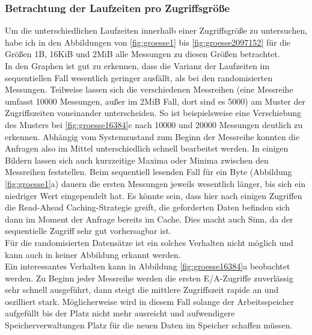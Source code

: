 \documentclass[
	12pt,
	a4paper,
	BCOR10mm,
	DIV14,
	listof=totoc,
	bibliography=totoc,
	headsepline
]{scrreprt}
\begin{document}
\subsubsection{Betrachtung der Laufzeiten pro Zugriffsgröße}
Um die unterschiedlichen Laufzeiten innerhalb einer Zugriffsgröße zu untersuchen, habe ich in den Abbildungen von \ref{fig:groesse1} bis \ref{fig:groesse2097152} für die Größen 1B, 16KiB und 2MiB alle Messungen zu diesen Größen betrachtet.\\
In den Graphen ist gut zu erkennen, dass die Varianz der Laufzeiten im sequentiellen Fall wesentlich geringer ausfällt, als bei den randomisierten Messungen.
Teilweise lassen sich die verschiedenen Messreihen (eine Messreihe umfasst 10000 Messungen, außer im 2MiB Fall, dort sind es 5000) am Muster der Zugriffszeiten voneinander unterscheiden.
So ist beispielsweise eine Verschiebung des Musters bei \ref{fig:groesse16384}c nach 10000 und 20000 Messungen deutlich zu erkennen.
Abhängig vom Systemzustand zum Beginn der Messreihe konnten die Anfragen also im Mittel unterschiedlich schnell bearbeitet werden.
In einigen Bildern lassen sich auch kurzzeitige Maxima oder Minima zwischen den Messreihen feststellen.
Beim sequentiell lesenden Fall für ein Byte (Abbildung \ref{fig:groesse1}a) dauern die ersten Messungen jeweils wesentlich länger, bis sich ein niedriger Wert eingependelt hat. Es könnte sein, dass hier nach einigen Zugriffen die Read-Ahead Caching-Strategie greift, die geforderten Daten befinden sich dann im Moment der Anfrage bereits im Cache. Dies macht auch Sinn, da der sequentielle Zugriff sehr gut vorhersagbar ist.\\
Für die randomisierten Datensätze ist ein solches Verhalten nicht möglich und kann auch in keiner Abbildung erkannt werden.\\
Ein interessantes Verhalten kann in Abbildung \ref{fig:groesse16384}a beobachtet werden.
Zu Beginn jeder Messreihe werden die ersten E/A-Zugriffe zuverlässig sehr schnell ausgeführt, dann steigt die mittlere Zugriffszeit rapide an und oszilliert stark.
Möglicherweise wird in diesem Fall solange der Arbeitsspeicher aufgefüllt bis der Platz nicht mehr ausreicht und aufwendigere Speicherverwaltungen Platz für die neuen Daten im Speicher schaffen müssen.
\end{document}
